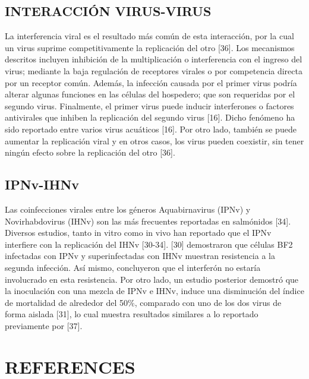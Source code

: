 \documentclass[]{elsarticle} %
\begin{document}
\hypertarget{interacciuxf3n-virus-virus}{%
\subsection{INTERACCIÓN VIRUS-VIRUS}\label{interacciuxf3n-virus-virus}}

La interferencia viral es el resultado más común de esta interacción, por la cual un virus suprime competitivamente la replicación del otro {[}36{]}. Los mecanismos descritos incluyen inhibición de la multiplicación o interferencia con el ingreso del virus; mediante la baja regulación de receptores virales o por competencia directa por un receptor común. Además, la infección causada por el primer virus podría alterar algunas funciones en las células del hospedero; que son requeridas por el segundo virus. Finalmente, el primer virus puede inducir interferones o factores antivirales que inhiben la replicación del segundo virus {[}16{]}. Dicho fenómeno ha sido reportado entre varios virus acuáticos {[}16{]}. Por otro lado, también se puede aumentar la replicación viral y en otros casos, los virus pueden coexistir, sin tener ningún efecto sobre la replicación del otro {[}36{]}.

\hypertarget{ipnv-ihnv}{%
\subsection{IPNv-IHNv}\label{ipnv-ihnv}}

Las coinfecciones virales entre los géneros Aquabirnavirus (IPNv) y Novirhabdovirus (IHNv) son las más frecuentes reportadas en salmónidos {[}34{]}. Diversos estudios, tanto in vitro como in vivo han reportado que el IPNv interfiere con la replicación del IHNv {[}30-34{]}. {[}30{]} demostraron que células BF2 infectadas con IPNv y superinfectadas con IHNv muestran resistencia a la segunda infección. Así mismo, concluyeron que el interferón no estaría involucrado en esta resistencia. Por otro lado, un estudio posterior demostró que la inoculación con una mezcla de IPNv e IHNv, induce una disminución del índice de mortalidad de alrededor del 50\%, comparado con uno de los dos virus de forma aislada {[}31{]}, lo cual muestra resultados similares a lo reportado previamente por {[}37{]}.

\hypertarget{references}{%
\section{REFERENCES}\label{references}}
\end{document}
